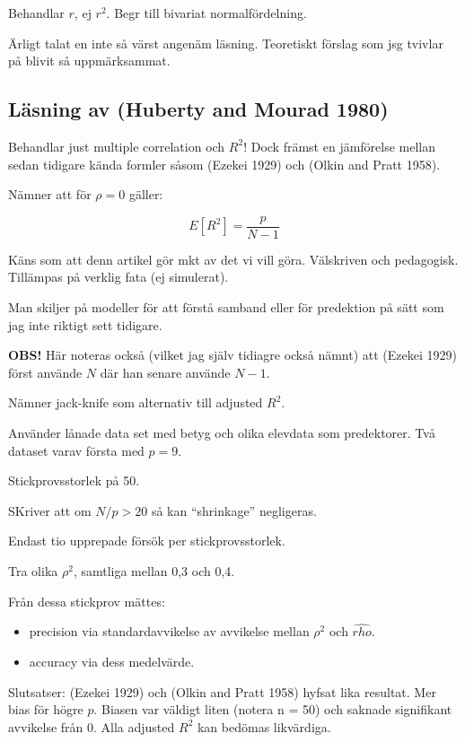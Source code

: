 \documentclass[]{article}
\providecommand{\tightlist}{%
  \setlength{\itemsep}{0pt}\setlength{\parskip}{0pt}}
\begin{document}
Behandlar \(r\), ej \(r^2\). Begr till bivariat normalfördelning.

Ärligt talat en inte så värst angenäm läsning. Teoretiskt förslag som
jsg tvivlar på blivit så uppmärksammat.

\subsection{Läsning av (Huberty and Mourad
1980)}\label{lasning-av-huberty1980}

Behandlar just multiple correlation och \(R^2\)! Dock främst en
jämförelse mellan sedan tidigare kända formler såsom (Ezekei 1929) och
(Olkin and Pratt 1958).

Nämner att för \(\rho = 0\) gäller:

\[E[R^2] = \frac{p}{N-1}\]

Käns som att denn artikel gör mkt av det vi vill göra. Välskriven och
pedagogisk. Tillämpas på verklig fata (ej simulerat).

Man skiljer på modeller för att förstå samband eller för predektion på
sätt som jag inte riktigt sett tidigare.

\textbf{OBS!} Här noteras också (vilket jag själv tidiagre också nämnt)
att (Ezekei 1929) först använde \(N\) där han senare använde \(N - 1\).

Nämner jack-knife som alternativ till adjusted \(R^2\).

Använder lånade data set med betyg och olika elevdata som predektorer.
Två dataset varav första med \(p = 9\).

Stickprovsstorlek på 50.

SKriver att om \(N/p>20\) så kan ``shrinkage'' negligeras.

Endast tio upprepade försök per stickprovsstorlek.

Tra olika \(\rho^2\), samtliga mellan 0,3 och 0,4.

Från dessa stickprov mättes:

\begin{itemize}
\tightlist
\item
  precision via standardavvikelse av avvikelse mellan \(\rho^2\) och
  \(\hat{rho}\).
\item
  accuracy via dess medelvärde.
\end{itemize}

Slutsatser: (Ezekei 1929) och (Olkin and Pratt 1958) hyfsat lika
resultat. Mer bias för högre \(p\). Biasen var väldigt liten (notera n =
50) och saknade signifikant avvikelse från 0. Alla adjusted \(R^2\) kan
bedömas likvärdiga.
\end{document}
